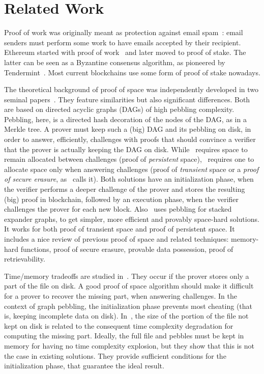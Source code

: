 \section{Related Work}\label{sec:related_work}

Proof of work was originally meant as protection against email spam~\cite{DworkN92}:
email senders must perform some work to have emails accepted by their recipient.
Ethereum started with proof of work~\cite{AntonopoulosW18} and later
moved to proof of stake. The latter can be seen as a
Byzantine consensus algorithm, as pioneered by Tendermint~\cite{Kwon14}.
Most current blockchains use some form of proof of stake nowadays.

The theoretical background of proof of space was independently developed
in two seminal papers~\cite{AtenieseBFG14,DziembowskiFKP15}.
They feature similarities but also significant differences. Both are based
on directed acyclic graphs (DAGs) of high pebbling complexity.
Pebbling, here, is a directed hash decoration of the nodes of the DAG, as in a Merkle tree.
A prover must keep such a (big) DAG and its pebbling on disk, in order to answer, efficiently,
challenges with proofs that should convince a verifier that
the prover is actually keeping the DAG on disk.
While~\cite{DziembowskiFKP15} requires space to remain allocated between challenges
(proof of \emph{persistent} space), \cite{AtenieseBFG14}~requires one
to allocate space only when answering challenges
(proof of \emph{transient} space or a \emph{proof of secure erasure}, as~\cite{DziembowskiFKP15} calls it).
Both solutions have an initialization phase, when the verifier performs a deeper challenge
of the prover and stores the resulting (big) proof in blockchain, followed by an execution phase,
when the verifier challenges the prover for each new block.
Also~\cite{RenD16} uses
pebbling for stacked expander graphs, to get simpler, more efficient and
provably space-hard solutions.
It works for both proof of transient space and proof of persistent space.
It includes a nice review of previous proof of space
and related techniques: memory-hard functions, proof of secure erasure, provable data possession,
proof of retrievability.

Time/memory tradeoffs are studied in~\cite{Reyzin23}. They occur if
the prover stores only a part of the file on disk.
A good proof of space algorithm should make it difficult for a prover to recover the
missing part, when answering challenges.
In the context of graph pebbling, the initialization phase prevents most cheating
(that is, keeping incomplete data on disk). In~\cite{Reyzin23}, the size
of the portion of the file not kept on disk is related to the consequent time
complexity degradation for computing the missing part.
Ideally, the full file and pebbles must be kept in memory
for having no time complexity explosion, but they show that this is not the case in existing solutions.
They provide sufficient conditions for the initialization phase, that guarantee the ideal result.

